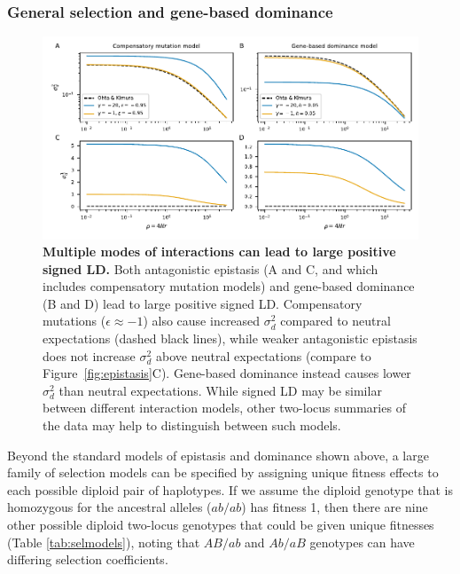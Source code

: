 \documentclass[]{article}
\begin{document}
\subsubsection{General selection and gene-based dominance}
\label{sec:general-selection}

\begin{figure}[tb!]
    \centering
    \includegraphics{../figures/gene-based-compensatory}
    \caption{
        \textbf{Multiple modes of interactions can lead to large positive signed LD.}
        Both antagonistic epistasis (A and C, and which includes compensatory mutation
        models) and gene-based dominance (B and D) lead to large positive signed LD.
        Compensatory mutations (\(\epsilon \approx -1\)) also cause increased
        \(\sigma_d^2\) compared to neutral expectations (dashed black lines),
        while weaker antagonistic epistasis does not increase \(\sigma_d^2\) above
        neutral expectations (compare to Figure~\ref{fig:epistasis}C).
        Gene-based dominance instead causes lower \(\sigma_d^2\) than neutral
        expectations.
        While signed LD may be similar between different interaction models,
        other two-locus summaries of the data may help to distinguish between
        such models.
        }
    \label{fig:gene-based-compensatory}
\end{figure}

Beyond the standard models of epistasis and dominance shown above, a large
family of selection models can be specified by assigning unique fitness effects
to each possible diploid pair of haplotypes. If we assume the diploid genotype
that is homozygous for the ancestral alleles (\(ab/ab\)) has fitness 1, then
there are nine other possible diploid two-locus genotypes that could be given
unique fitnesses (Table \ref{tab:selmodels}), noting that \(AB/ab\) and
\(Ab/aB\) genotypes can have differing selection coefficients.
\end{document}
